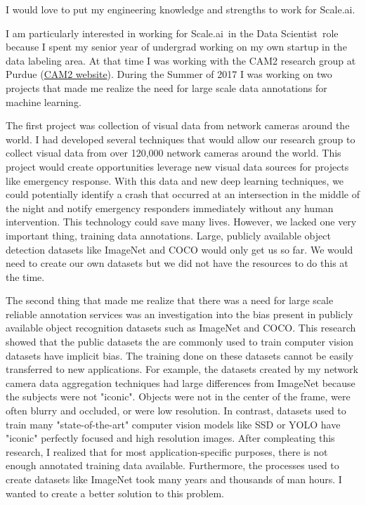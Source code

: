\documentclass[10pt]{article}
\newcommand{\cvdurationstyle}[1]{{\small\cvdurationfont\textcolor{cvdurationcolor}{#1}}}
\newlength{\cvaftersectionskipamount}
\newcommand{\company}{Scale.ai}
\newcommand{\job}{Data Scientist}
\begin{document}

\vspace{4\cvaftersectionskipamount}

\noindent I would love to put my engineering knowledge and strengths to work for \company. 

\vspace{2\cvaftersectionskipamount}

I am particularly interested in working for \company~in the \job~role because I spent my senior year of undergrad working on my own startup in the data labeling area. At that time I was working with the CAM2 research group at Purdue (\href{https://www.cam2project.net/}{CAM2 website}). During the Summer of 2017 I was working on two projects that made me realize the need for large scale data annotations for machine learning. 

The first project was collection of visual data from network cameras around the world. I had developed several techniques that would allow our research group to collect visual data from over 120,000 network cameras around the world. This project would create opportunities leverage new visual data sources for projects like emergency response. With this data and new deep learning techniques, we could potentially identify a crash that occurred at an intersection in the middle of the night and notify emergency responders immediately without any human intervention. This technology could save many lives. However, we lacked one very important thing, training data annotations. Large, publicly available object detection datasets like ImageNet and COCO would only get us so far. We would need to create our own datasets but we did not have the resources to do this at the time. 

The second thing that made me realize that there was a need for large scale reliable annotation services was an investigation into the bias present in publicly available object recognition datasets such as ImageNet and COCO. This research showed that the public datasets the are commonly used to train computer vision datasets have implicit bias. The training done on these datasets cannot be easily transferred to new applications. For example, the datasets created by my network camera data aggregation techniques had large differences from ImageNet because the subjects were not "iconic". Objects were not in the center of the frame, were often blurry and occluded, or were low resolution. In contrast, datasets used to train many "state-of-the-art" computer vision models like SSD or YOLO have "iconic" perfectly focused and high resolution images. After compleating this research, I realized that for most application-specific purposes, there is not enough annotated training data available. Furthermore, the processes used to create datasets like ImageNet took many years and thousands of man hours. I wanted to create a better solution to this problem. 
\end{document}
